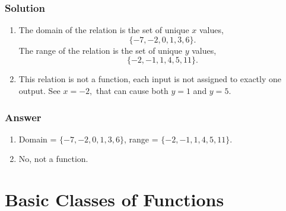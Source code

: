 \documentclass[11pt, letterpaper, oneside]{memoir}
\begin{document}
\subsubsection{Solution}

\begin{enumerate}[label=(\alph*)]
  \item The domain of the relation is the set of unique $ x $ values,
    $$ \phantom{.}
    \{ -7, -2, 0, 1, 3, 6 \}
    .$$
    The range of the relation is the set of unique $ y $ values,
    $$ \phantom{.}
    \{ -2, -1, 1, 4, 5, 11\}
    .$$
  \item This relation is not a function, each input is not assigned to exactly one output. See $ x = -2, $ that can cause both $ y = 1 $ and $ y = 5 $.
\end{enumerate}

\subsubsection{Answer}

\begin{enumerate}[label=(\alph*)]
  \item Domain = $  \{ -7, -2, 0, 1, 3, 6 \} $, range = $ \{ -2, -1, 1, 4, 5, 11\} $.
  \item No, not a function.
\end{enumerate}












\section{Basic Classes of Functions}






\end{document}
